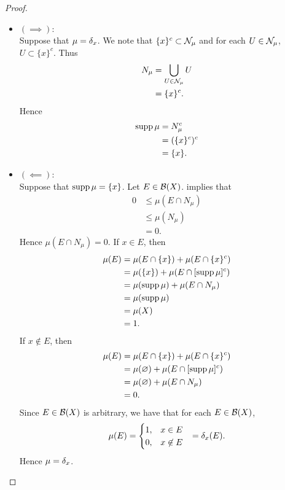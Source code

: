 \documentclass{book}
\begin{document}
	\begin{proof}\
		\begin{itemize}
			\item $(\implies)$: \\
			Suppose that $\mu = \delta_x$. We note that $\{x\}^c \subset \mathcal{N}_{\mu}$ and for each $U \in \mathcal{N}_{\mu}$, $U \subset \{x\}^c$. Thus 
			\begin{align*}
				N_{\mu}
				& = \bigcup\limits_{U \in \mathcal{N}_{\mu}} U \\
				& = \{x\}^c.
			\end{align*}
			Hence 
			\begin{align*}
				\operatorname{supp} \mu
				& = N_{\mu}^c \\
				& = (\{x\}^c)^c \\
				& = \{x\}.
			\end{align*}
			\item $(\impliedby)$: \\
			Suppose that $\operatorname{supp} \mu = \{x\}$. Let $E \in \mathcal{B}(X)$.  implies that 
			\begin{align*}
				0
				& \leq \mu(E \cap N_{\mu}) \\
				& \leq \mu(N_{\mu}) \\
				& = 0.
			\end{align*}
			Hence $\mu(E \cap N_{\mu}) = 0$. If $x \in E$, then 
			\begin{align*}
				\mu(E)
				& = \mu(E \cap \{x\}) + \mu(E \cap \{x\}^c) \\
				& = \mu(\{x\}) + \mu(E \cap [\operatorname{supp} \mu]^c) \\
				& = \mu(\operatorname{supp} \mu) + \mu(E \cap N_{\mu}) \\
				& = \mu(\operatorname{supp} \mu) \\
				& = \mu(X) \\
				& = 1.
			\end{align*}
			If $x \not \in E$, then 
			\begin{align*}
				\mu(E)
				& = \mu(E \cap \{x\}) + \mu(E \cap \{x\}^c) \\
				& = \mu(\varnothing) + \mu(E \cap [\operatorname{supp} \mu]^c) \\
				& = \mu(\varnothing) + \mu(E \cap N_{\mu}) \\
				& = 0.
			\end{align*}
			Since $E \in \mathcal{B}(X)$ is arbitrary, we have that for each $E \in \mathcal{B}(X)$, 
			\begin{align*}
				\mu(E)
				& = 
				\begin{cases}
					1, & x \in E \\
					0, & x \not \in E
				\end{cases}
				& = \delta_x(E).
			\end{align*}
			Hence $\mu = \delta_x$.
		\end{itemize}
	\end{proof}
	
\end{document}
